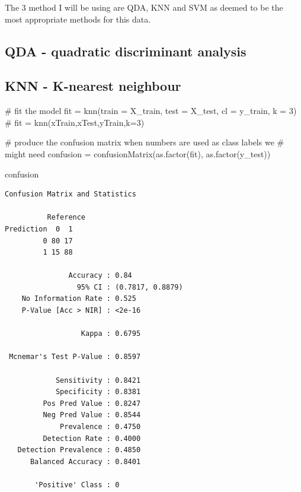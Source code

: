 \documentclass[
  letterpaper,
  DIV=11,
  numbers=noendperiod]{scrartcl}
\newenvironment{Shaded}{\begin{snugshade}}{\end{snugshade}}
\newcommand{\AttributeTok}[1]{\textcolor[rgb]{0.40,0.45,0.13}{#1}}
\newcommand{\CommentTok}[1]{\textcolor[rgb]{0.37,0.37,0.37}{#1}}
\newcommand{\DecValTok}[1]{\textcolor[rgb]{0.68,0.00,0.00}{#1}}
\newcommand{\FunctionTok}[1]{\textcolor[rgb]{0.28,0.35,0.67}{#1}}
\newcommand{\NormalTok}[1]{\textcolor[rgb]{0.00,0.23,0.31}{#1}}
\newcommand{\OtherTok}[1]{\textcolor[rgb]{0.00,0.23,0.31}{#1}}
\begin{document}
The 3 method I will be using are QDA, KNN and SVM as deemed to be the
most appropriate methods for this data.

\hypertarget{qda---quadratic-discriminant-analysis}{%
\subsection{QDA - quadratic discriminant
analysis}\label{qda---quadratic-discriminant-analysis}}

\hypertarget{knn---k-nearest-neighbour}{%
\subsection{KNN - K-nearest neighbour}\label{knn---k-nearest-neighbour}}

\begin{Shaded}
\begin{Highlighting}[]
\CommentTok{\# fit the model}
\NormalTok{fit }\OtherTok{=} \FunctionTok{knn}\NormalTok{(}\AttributeTok{train =}\NormalTok{ X\_train, }\AttributeTok{test =}\NormalTok{ X\_test, }\AttributeTok{cl =}\NormalTok{ y\_train, }\AttributeTok{k =} \DecValTok{3}\NormalTok{)}
\CommentTok{\# fit = knn(xTrain,xTest,yTrain,k=3)}

\CommentTok{\# produce the confusion matrix when numbers are used as class labels we}
\CommentTok{\# might need}
\NormalTok{confusion }\OtherTok{=} \FunctionTok{confusionMatrix}\NormalTok{(}\FunctionTok{as.factor}\NormalTok{(fit), }\FunctionTok{as.factor}\NormalTok{(y\_test))}

\NormalTok{confusion}
\end{Highlighting}
\end{Shaded}

\begin{verbatim}
Confusion Matrix and Statistics

          Reference
Prediction  0  1
         0 80 17
         1 15 88
                                          
               Accuracy : 0.84            
                 95% CI : (0.7817, 0.8879)
    No Information Rate : 0.525           
    P-Value [Acc > NIR] : <2e-16          
                                          
                  Kappa : 0.6795          
                                          
 Mcnemar's Test P-Value : 0.8597          
                                          
            Sensitivity : 0.8421          
            Specificity : 0.8381          
         Pos Pred Value : 0.8247          
         Neg Pred Value : 0.8544          
             Prevalence : 0.4750          
         Detection Rate : 0.4000          
   Detection Prevalence : 0.4850          
      Balanced Accuracy : 0.8401          
                                          
       'Positive' Class : 0               
                                          
\end{verbatim}
\end{document}
